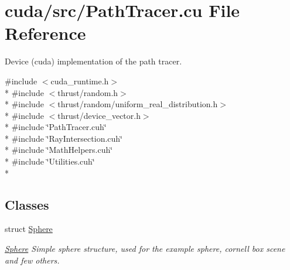 \hypertarget{PathTracer_8cu}{\section{cuda/src/\-Path\-Tracer.cu File Reference}
\label{PathTracer_8cu}
}


Device (cuda) implementation of the path tracer.  


{\ttfamily \#include $<$cuda\-\_\-runtime.\-h$>$}\\*
{\ttfamily \#include $<$thrust/random.\-h$>$}\\*
{\ttfamily \#include $<$thrust/random/uniform\-\_\-real\-\_\-distribution.\-h$>$}\\*
{\ttfamily \#include $<$thrust/device\-\_\-vector.\-h$>$}\\*
{\ttfamily \#include \char`\"{}Path\-Tracer.\-cuh\char`\"{}}\\*
{\ttfamily \#include \char`\"{}Ray\-Intersection.\-cuh\char`\"{}}\\*
{\ttfamily \#include \char`\"{}Math\-Helpers.\-cuh\char`\"{}}\\*
{\ttfamily \#include \char`\"{}Utilities.\-cuh\char`\"{}}\\*
\subsection*{Classes}
\begin{DoxyCompactItemize}
\item 
struct \hyperlink{structSphere}{Sphere}
\begin{DoxyCompactList}\small\item\em \hyperlink{structSphere}{Sphere} Simple sphere structure, used for the example sphere, cornell box scene and few others. \end{DoxyCompactList}\end{DoxyCompactItemize}
